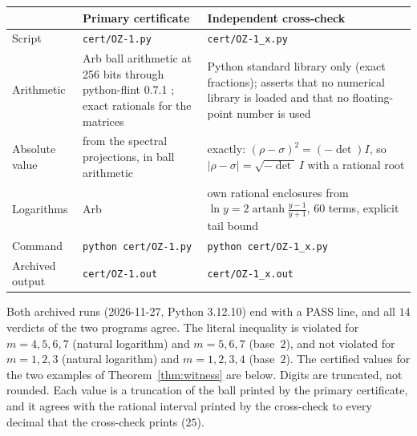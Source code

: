 \documentclass[11pt]{amsart}
\theoremstyle{definition}\newtheorem{definition}[theorem]{Definition}
\theoremstyle{remark}\newtheorem{remark}[theorem]{Remark}
\DeclareMathOperator{\artanh}{artanh}
\newcommand{\abs}[1]{\lvert #1\rvert}
\begin{document}
\begin{center}
\small
\begin{tabular}{L{0.17\textwidth}L{0.35\textwidth}L{0.35\textwidth}}
\toprule
 & Primary certificate & Independent cross-check \\
\midrule
Script & \texttt{cert/OZ-1.py} & \texttt{cert/OZ-1\_x.py} \\
Arithmetic & Arb ball arithmetic at 256 bits through python-flint 0.7.1 \cite{flint}; exact rationals for the matrices & Python standard library only (exact fractions); asserts that no numerical library is loaded and that no floating-point number is used \\
Absolute value & from the spectral projections, in ball arithmetic & exactly: \((\rho-\sigma)^2=(-\det)I\), so \(\abs{\rho-\sigma}=\sqrt{-\det}\,I\) with a rational root \\
Logarithms & Arb & own rational enclosures from \(\ln y=2\artanh\frac{y-1}{y+1}\), 60 terms, explicit tail bound \\
Command & \texttt{python cert/OZ-1.py} & \texttt{python cert/OZ-1\_x.py} \\
Archived output & \texttt{cert/OZ-1.out} & \texttt{cert/OZ-1\_x.out} \\
\bottomrule
\end{tabular}
\end{center}

Both archived runs (2026-11-27, Python 3.12.10) end with a PASS line, and all \(14\) verdicts of the two programs agree. The literal inequality is violated for \(m=4,5,6,7\) (natural logarithm) and \(m=5,6,7\) (base~\(2\)), and not violated for \(m=1,2,3\) (natural logarithm) and \(m=1,2,3,4\) (base~\(2\)). The certified values for the two examples of Theorem~\ref{thm:witness} are below. Digits are truncated, not rounded. Each value is a truncation of the ball printed by the primary certificate, and it agrees with the rational interval printed by the cross-check to every decimal that the cross-check prints (\(25\)).
\end{document}
